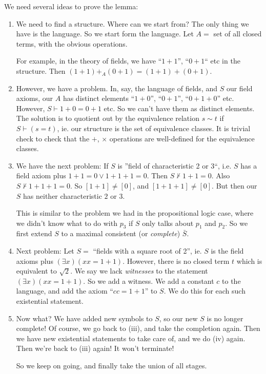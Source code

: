 \documentclass[a4paper]{article}
\begin{document}
We need several ideas to prove the lemma:
\begin{enumerate}
  \item We need to find a structure. Where can we start from? The only thing we have is the language. So we start form the language. Let $A =$ set of all closed terms, with the obvious operations.

    For example, in the theory of fields, we have ``$1 + 1$'', ``$0 + 1$`` etc in the structure. Then $(1 + 1) +_A (0 + 1) = (1 + 1) + (0 + 1)$.
  \item However, we have a problem. In, say, the language of fields, and $S$ our field axioms, our $A$ has distinct elements ``$1 + 0$'', ``$0 + 1$'', ``$0 + 1 + 0$'' etc. However, $S\vdash 1 + 0 = 0 + 1$ etc. So we can't have them as distinct elements. The solution is to quotient out by the equivalence relation $s\sim t$ if $S\vdash (s = t)$, ie. our structure is the set of equivalence classes. It is trivial check to check that the $+$, $\times$ operations are well-defined for the equivalence classes.
  \item We have the next problem: If $S$ is ''field of characteristic 2 or 3``, i.e. $S$ has a field axiom plus $1 + 1 = 0 \vee  1 + 1 + 1 = 0$. Then $S\not\vdash 1 + 1 = 0$. Also $S\not\vdash 1 + 1 + 1 = 0$. So $[1 + 1] \not = [0]$, and $[1 + 1 + 1] \not= [0]$. But then our $S$ has neither characteristic $2$ or $3$.

    This is similar to the problem we had in the propositional logic case, where we didn't know what to do with $p_3$ if $S$ only talks about $p_1$ and $p_2$. So we first extend $S$ to a maximal consistent (or \emph{complete}) $\bar S$.

  \item Next problem: Let $S =$ ``fields with a square root of 2'', ie. $S$ is the field axioms plus $(\exists x)(xx = 1 + 1)$. However, there is no closed term $t$ which is equivalent to $\sqrt{2}$. We say we lack \emph{witnesses} to the statement $(\exists x)(xx = 1 + 1)$. So we add a witness. We add a constant $c$ to the language, and add the axiom ``$cc = 1 + 1$'' to $S$. We do this for each such existential statement.

  \item Now what? We have added new symbols to $S$, so our new $S$ is no longer complete! Of course, we go back to (iii), and take the completion again. Then we have new existential statements to take care of, and we do (iv) again. Then we're back to (iii) again! It won't terminate!

      So we keep on going, and finally take the union of all stages.
  \end{enumerate}
\end{document}
